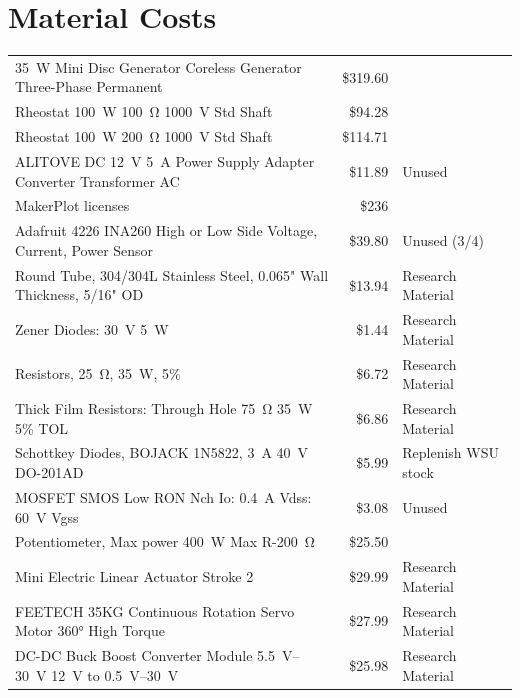 \documentclass[11pt,letterpaper,conference]{IEEEtran}
\begin{document}
\section{Material Costs}
\label{apx:costs}
\begin{table}[th]
    \centering
    \begin{NiceTabular}{lrl}
        \toprule
         &  &  \\
        \midrule
        \qty{35}{\W} Mini Disc Generator Coreless Generator Three-Phase Permanent &
        \$319.60 & \\
        Rheostat \qty{100}{\W} \qty{100}{\ohm} \qty{1000}{\volt} Std Shaft & \$94.28 & \\
        Rheostat \qty{100}{\W} \qty{200}{\ohm} \qty{1000}{\volt} Std Shaft & \$114.71 & \\
        ALITOVE DC \qty{12}{\V} \qty{5}{\A} Power Supply Adapter Converter Transformer AC & \$11.89 & Unused \\
        MakerPlot licenses & \$236 & \\
        Adafruit 4226 INA260 High or Low Side Voltage, Current, Power Sensor & \$39.80 & Unused (3/4) \\
        Round Tube, 304/304L Stainless Steel, 0.065" Wall Thickness, 5/16" OD & \$13.94 & Research Material \\
        Zener Diodes: \qty{30}{\V} \qty{5}{\W} & \$1.44 & Research Material \\
        Resistors, \qty{25}{\ohm}, \qty{35}{\W}, 5\% & \$6.72 & Research Material \\
        Thick Film Resistors: Through Hole \qty{75}{\ohm} \qty{35}{\W} 5\% TOL & \$6.86 & Research Material \\
        Schottkey Diodes, BOJACK 1N5822, \qty{3}{\A} \qty{40}{\V} DO-201AD & \$5.99 & Replenish WSU stock \\
        MOSFET SMOS Low RON Nch Io: \qty{0.4}{\A} Vdss: \qty{60}{\V} Vgss & \$3.08 & Unused \\
        Potentiometer, Max power \qty{400}{\W} Max R-\qty{200}{\ohm} & \$25.50 & \\
        Mini Electric Linear Actuator Stroke 2 & \$29.99 & Research Material \\
        FEETECH 35KG Continuous Rotation Servo Motor \ang{360} High Torque & \$27.99 & Research Material \\
        DC-DC Buck Boost Converter Module \qtyrange{5.5}{30}{\V} \qty{12}{\V} to \qtyrange{0.5}{30}{\V} & \$25.98 & Research Material \\

\end{NiceTabular}
\end{table}
\end{document}
